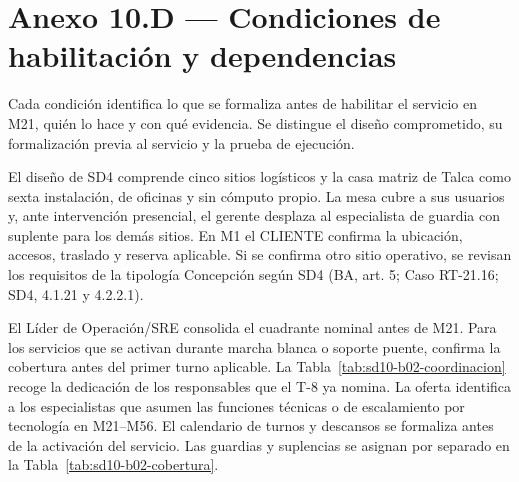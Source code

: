
\section*{Anexo 10.D — Condiciones de habilitación y dependencias}
\label{anx:sd10-brechas}

Cada condición identifica lo que se formaliza antes de habilitar el servicio en M21, quién lo hace y con qué evidencia. Se distingue el diseño comprometido, su formalización previa al servicio y la prueba de ejecución.

\begin{description}[style=nextline,leftmargin=0pt,labelwidth=0pt,labelsep=0pt,font=\normalfont\intersemibold]
\item[B-01. Número de instalaciones.]
El diseño de SD4 comprende cinco sitios logísticos y la casa matriz de Talca como sexta instalación, de oficinas y sin cómputo propio. La mesa cubre a sus usuarios y, ante intervención presencial, el gerente desplaza al especialista de guardia con suplente para los demás sitios. En M1 el CLIENTE confirma la ubicación, accesos, traslado y reserva aplicable. Si se confirma otro sitio operativo, se revisan los requisitos de la tipología Concepción según SD4 (BA, art. 5; Caso RT-21.16; SD4, 4.1.21 y 4.2.2.1).

\item[B-02. Habilitación y guardias.]
El Líder de Operación/SRE consolida el cuadrante nominal antes de M21. Para los servicios que se activan durante marcha blanca o soporte puente, confirma la cobertura antes del primer turno aplicable. La Tabla~\ref{tab:sd10-b02-coordinacion} recoge la dedicación de los responsables que el T-8 ya nomina. La oferta identifica a los especialistas que asumen las funciones técnicas o de escalamiento por tecnología en M21--M56. El calendario de turnos y descansos se formaliza antes de la activación del servicio. Las guardias y suplencias se asignan por separado en la Tabla~\ref{tab:sd10-b02-cobertura}.


\end{description}

